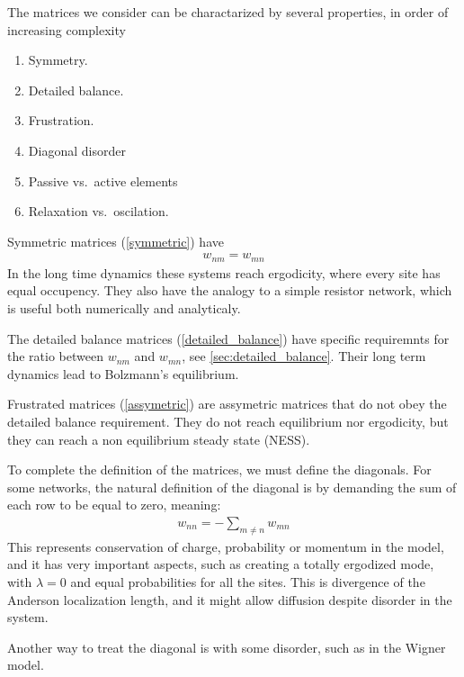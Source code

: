 The matrices we consider can be charactarized by several properties,  
in order of increasing complexity
\begin{enumerate}
    \item
        \label{symmetric} Symmetry.
    \item
        \label{detailed_balance} Detailed balance.
    \item
       \label{assymetric} Frustration.
    \item 
       \label{diagonal} Diagonal disorder
    \item
       \label{active} Passive vs.\ active elements
    \item
       \label{relaxation} Relaxation vs.\ oscilation.
\end{enumerate}
%
Symmetric matrices (\ref{symmetric}) have
%
\begin{align}
w_{nm}=w_{mn}
\end{align}
%
In the long time dynamics these systems reach ergodicity, where every 
site has equal occupency. They also have the analogy to a
simple resistor network, which is useful both numerically and analyticaly. 


The detailed balance matrices (\ref{detailed_balance}) have specific 
requiremnts for the ratio between $w_{nm}$ and $w_{mn}$, see \ref{sec:detailed_balance}.
Their long term dynamics lead to Bolzmann's equilibrium. 


Frustrated matrices (\ref{assymetric}) are assymetric matrices 
that do not obey the detailed balance requirement.  
They do not reach equilibrium nor ergodicity, but they can reach
a non equilibrium steady state (NESS). 





To complete the definition of the matrices, we must define the diagonals.
For some networks, the
natural definition of the diagonal is by demanding the sum of each row to 
be equal to zero, meaning:
%
\begin{align}\label{eq:zero_sum}
w_{nn} = -\sum_{m\ne n} w_{mn}
\end{align}
%
This represents conservation of charge, probability or momentum
in the model, and it has very important aspects, such as creating a totally ergodized mode,
with $\lambda=0$ and equal probabilities for all the sites. This is divergence 
of the Anderson localization length, and it might allow diffusion despite 
disorder in the system.


Another way to treat the diagonal is with some disorder, such as in the
Wigner model.


